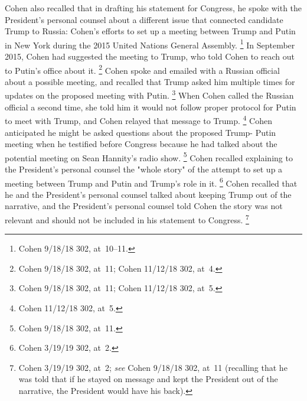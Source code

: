 Cohen also recalled that in drafting his statement for Congress, he spoke with the President's personal counsel about a different issue that connected candidate Trump to Russia: Cohen's efforts to set up a meeting between Trump and Putin in New York during the 2015 United Nations General Assembly.%
\footnote{Cohen 9/18/18 302, at~10--11.}
In September 2015, Cohen had suggested the meeting to Trump, who told Cohen to reach out to Putin's office about it.%
\footnote{Cohen 9/18/18 302, at~11;
Cohen 11/12/18 302, at~4.}
Cohen spoke and emailed with a Russian official about a possible meeting, and recalled that Trump asked him multiple times for updates on the proposed meeting with Putin.%
\footnote{Cohen 9/18/18 302, at~11;
Cohen 11/12/18 302, at~5.}
When Cohen called the Russian official a second time, she told him it would not follow proper protocol for Putin to meet with Trump, and Cohen relayed that message to Trump.%
\footnote{Cohen 11/12/18 302, at~5.}
Cohen anticipated he might be asked questions about the proposed Trump- Putin meeting when he testified before Congress because he had talked about the potential meeting on Sean Hannity's radio show.%
\footnote{Cohen 9/18/18 302, at~11.}
Cohen recalled explaining to the President's personal counsel the "whole story" of the attempt to set up a meeting between Trump and Putin and Trump's role in it.%
\footnote{Cohen 3/19/19 302, at~2.}
Cohen recalled that he and the President's personal counsel talked about keeping Trump out of the narrative, and the President's personal counsel told Cohen the story was not relevant and should not be included in his statement to Congress.%
\footnote{Cohen 3/19/19 302, at~2;
\textit{see} Cohen 9/18/18 302, at~11 (recalling that he was told that if he stayed on message and kept the President out of the narrative, the President would have his back).}

